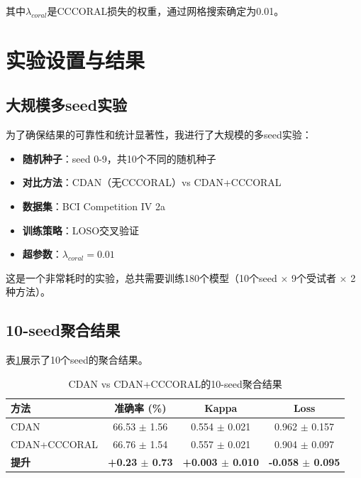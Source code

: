 \documentclass[12pt,a4paper]{ctexart}
\begin{document}
其中$\lambda_{coral}$是CCCORAL损失的权重，通过网格搜索确定为0.01。

\section{实验设置与结果}

\subsection{大规模多seed实验}

为了确保结果的可靠性和统计显著性，我进行了大规模的多seed实验：

\begin{itemize}
    \item \textbf{随机种子}：seed 0-9，共10个不同的随机种子
    \item \textbf{对比方法}：CDAN（无CCCORAL）vs CDAN+CCCORAL
    \item \textbf{数据集}：BCI Competition IV 2a
    \item \textbf{训练策略}：LOSO交叉验证
    \item \textbf{超参数}：$\lambda_{coral} = 0.01$
\end{itemize}

这是一个非常耗时的实验，总共需要训练180个模型（10个seed × 9个受试者 × 2种方法）。

\subsection{10-seed聚合结果}

表\ref{tab:10seed_results}展示了10个seed的聚合结果。

\begin{table}[H]
\centering
\caption{CDAN vs CDAN+CCCORAL的10-seed聚合结果}
\label{tab:10seed_results}
\begin{tabular}{lccc}
\toprule
\textbf{方法} & \textbf{准确率 (\%)} & \textbf{Kappa} & \textbf{Loss} \\
\midrule
CDAN & 66.53 $\pm$ 1.56 & 0.554 $\pm$ 0.021 & 0.962 $\pm$ 0.157 \\
CDAN+CCCORAL & 66.76 $\pm$ 1.54 & 0.557 $\pm$ 0.021 & 0.904 $\pm$ 0.097 \\
\midrule
\textbf{提升} & \textbf{+0.23 $\pm$ 0.73} & \textbf{+0.003 $\pm$ 0.010} & \textbf{-0.058 $\pm$ 0.095} \\
\bottomrule
\end{tabular}
\end{table}
\end{document}

